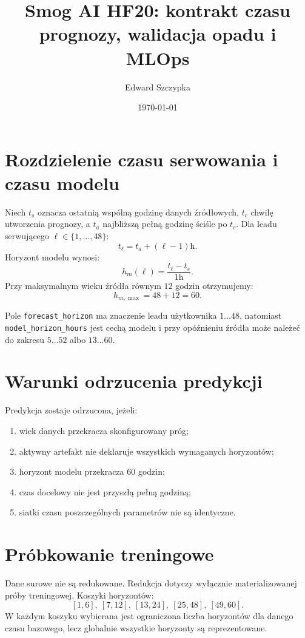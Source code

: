 \documentclass[11pt,a4paper]{article}
\title{Smog AI HF20: kontrakt czasu prognozy, walidacja opadu i MLOps}
\author{Edward Szczypka}
\date{\today}
\begin{document}
\maketitle

\section{Rozdzielenie czasu serwowania i czasu modelu}

Niech $t_s$ oznacza ostatnią wspólną godzinę danych źródłowych,
$t_c$ chwilę utworzenia prognozy, a $t_a$ najbliższą pełną godzinę ściśle po
$t_c$. Dla leadu serwującego $\ell\in\{1,\ldots,48\}$:
\[
 t_{\ell}=t_a+(\ell-1)\mathrm{h}.
\]
Horyzont modelu wynosi:
\[
 h_m(\ell)=\frac{t_{\ell}-t_s}{1\mathrm{h}}.
\]
Przy maksymalnym wieku źródła równym $12$ godzin otrzymujemy:
\[
 h_{m,\max}=48+12=60.
\]

Pole \texttt{forecast\_horizon} ma znaczenie leadu użytkownika $1\ldots48$,
natomiast \texttt{model\_horizon\_hours} jest cechą modelu i przy opóźnieniu
źródła może należeć do zakresu $5\ldots52$ albo $13\ldots60$.

\section{Warunki odrzucenia predykcji}

Predykcja zostaje odrzucona, jeżeli:
\begin{enumerate}[nosep]
  \item wiek danych przekracza skonfigurowany próg;
  \item aktywny artefakt nie deklaruje wszystkich wymaganych horyzontów;
  \item horyzont modelu przekracza $60$ godzin;
  \item czas docelowy nie jest przyszłą pełną godziną;
  \item siatki czasu poszczególnych parametrów nie są identyczne.
\end{enumerate}

\section{Próbkowanie treningowe}

Dane surowe nie są redukowane. Redukcja dotyczy wyłącznie materializowanej
próby treningowej. Koszyki horyzontów:
\[
[1,6],\ [7,12],\ [13,24],\ [25,48],\ [49,60].
\]
W każdym koszyku wybierana jest ograniczona liczba horyzontów dla danego czasu
bazowego, lecz globalnie wszystkie horyzonty są reprezentowane.
\end{document}
